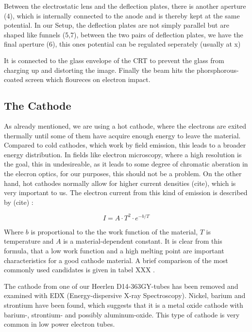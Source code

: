 Between the electrostatic lens and the deflection plates, there is another aperture (4), which is internally connected to the anode and is thereby kept at the same potential. In our Setup, the deflection plates are not simply parallel but are shaped like funnels (5,7), between the two pairs of deflection plates, we have the final aperture (6), this ones potential can be regulated seperately  (usually at x) 


It is connected to the glass envelope of the CRT to prevent the glass from charging up and distorting the image. 
Finally the beam hits the phorsphorous-coated screen which floureces on electron impact.

\subsection{The Cathode}

As already mentioned, we are using a hot cathode, where the electrons are exited thermally until some of them have acquire enough energy to leave the material. Compared to cold cathodes, which work by field emission, this leads to a broader energy distribution. In fields like electron microscopy, where a high resolution is the goal, this in undesireable, as it leads to some degree of chromatic aberation in the elecron optics, for our purposes, this should not be a problem. On the other hand, hot cathodes normally allow for higher current densities  (cite), which is very important to us. The  electron current from this kind of emission is described by (cite) : 

\begin{equation}\label{eq:thermionic_current}
I=A\cdot T^2 \cdot e^{-b/T}
\end{equation}

Where $b$ is proportional to the the work function of the material, $T$ is temperature and $A$ is a material-dependent constant. It is clear from this formula, that a low work function and a high melting point are important characteristics for a good cathode material. A brief comparison of the most commonly used candidates is given in tabel XXX .

The cathode from one of our Heerlen D14-363GY-tubes has been removed and examined with EDX (Energy-dispersive X-ray Spectroscopy). Nickel, barium and strontium have been found, which suggests that it is a metal oxide cathode with barium-, strontium- and possibly aluminum-oxide. This type of cathode is very common in low power electron tubes.

